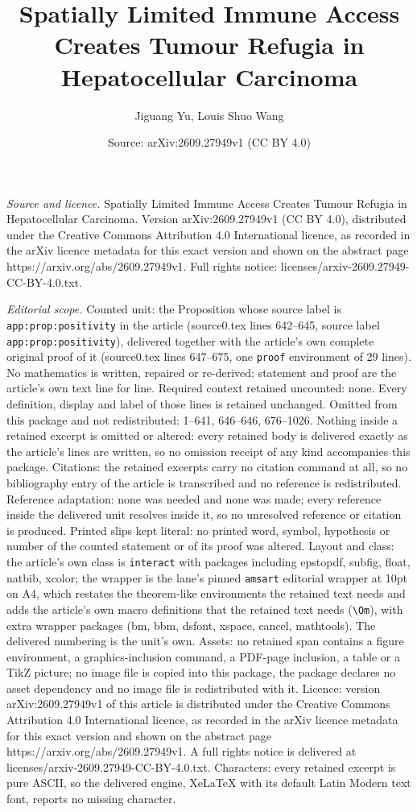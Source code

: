 \documentclass[10pt,a4paper]{amsart}
\title[Spatially Limited Immune Access Creates Tumour Refugia in He]{Spatially Limited Immune Access Creates Tumour Refugia in Hepatocellular Carcinoma}
\author{Jiguang Yu, Louis Shuo Wang}
\date{Source: arXiv:2609.27949v1 (CC BY 4.0)}
\begin{document}
\maketitle

\noindent\emph{Source and licence.} Spatially Limited Immune Access Creates Tumour Refugia in Hepatocellular Carcinoma. Version arXiv:2609.27949v1 (CC BY 4.0), distributed under the Creative Commons Attribution 4.0 International licence, as recorded in the arXiv licence metadata for this exact version and shown on the abstract page https://arxiv.org/abs/2609.27949v1. Full rights notice: licenses/arxiv-2609.27949-CC-BY-4.0.txt.\par\smallskip

\noindent\textit{Editorial scope.} Counted unit: the Proposition whose source label is \texttt{app:prop:positivity} in the article (source0.tex lines 642--645, source label \texttt{app:prop:positivity}), delivered together with the article's own complete original proof of it (source0.tex lines 647--675, one \texttt{proof} environment of 29 lines). No mathematics is written, repaired or re-derived: statement and proof are the article's own text line for line. Required context retained uncounted: none. Every definition, display and label of those lines is retained unchanged. Omitted from this package and not redistributed: 1--641, 646--646, 676--1026. Nothing inside a retained excerpt is omitted or altered: every retained body is delivered exactly as the article's lines are written, so no omission receipt of any kind accompanies this package. Citations: the retained excerpts carry no citation command at all, so no bibliography entry of the article is transcribed and no reference is redistributed. Reference adaptation: none was needed and none was made; every reference inside the delivered unit resolves inside it, so no unresolved reference or citation is produced. Printed slips kept literal: no printed word, symbol, hypothesis or number of the counted statement or of its proof was altered. Layout and class: the article's own class is \texttt{interact} with packages including epstopdf, subfig, float, natbib, xcolor; the wrapper is the lane's pinned \texttt{amsart} editorial wrapper at 10pt on A4, which restates the theorem-like environments the retained text needs and adds the article's own macro definitions that the retained text needs (\texttt{\textbackslash Om}), with extra wrapper packages (bm, bbm, dsfont, xspace, cancel, mathtools). The delivered numbering is the unit's own. Assets: no retained span contains a figure environment, a graphics-inclusion command, a PDF-page inclusion, a table or a TikZ picture; no image file is copied into this package, the package declares no asset dependency and no image file is redistributed with it. Licence: version arXiv:2609.27949v1 of this article is distributed under the Creative Commons Attribution 4.0 International licence, as recorded in the arXiv licence metadata for this exact version and shown on the abstract page https://arxiv.org/abs/2609.27949v1. A full rights notice is delivered at licenses/arxiv-2609.27949-CC-BY-4.0.txt. Characters: every retained excerpt is pure ASCII, so the delivered engine, XeLaTeX with its default Latin Modern text font, reports no missing character.
\end{document}
